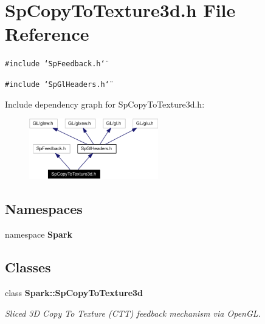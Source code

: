 \section{Sp\-Copy\-To\-Texture3d.h File Reference}
\label{SpCopyToTexture3d_8h}
{\tt \#include \char`\"{}Sp\-Feedback.h\char`\"{}}\par
{\tt \#include \char`\"{}Sp\-Gl\-Headers.h\char`\"{}}\par


Include dependency graph for Sp\-Copy\-To\-Texture3d.h:\begin{figure}[H]
\begin{center}
\leavevmode
\includegraphics[width=159pt]{SpCopyToTexture3d_8h__incl}
\end{center}
\end{figure}
\subsection*{Namespaces}
\begin{CompactItemize}
\item 
namespace {\bf Spark}
\end{CompactItemize}
\subsection*{Classes}
\begin{CompactItemize}
\item 
class {\bf Spark::Sp\-Copy\-To\-Texture3d}
\begin{CompactList}\small\item\em Sliced 3D Copy To Texture (CTT) feedback mechanism via Open\-GL. \item\end{CompactList}\end{CompactItemize}
